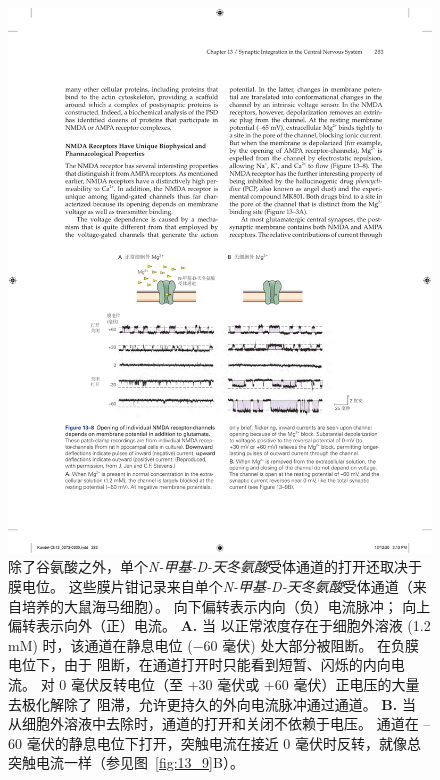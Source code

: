 \begin{figure}[htbp]
	\centering
	\includegraphics[width=0.9\linewidth]{chap13/fig_13_8}
	\caption{除了谷氨酸之外，单个\textit{N-甲基-D-天冬氨酸}受体通道的打开还取决于膜电位。
		这些膜片钳记录来自单个\textit{N-甲基-D-天冬氨酸}受体通道（来自培养的大鼠海马细胞）。
		向下偏转表示内向（负）电流脉冲；
		向上偏转表示向外（正）电流。
		\textbf{A.} 当  以正常浓度存在于细胞外溶液 (1.2 mM) 时，该通道在静息电位 (−60 毫伏) 处大部分被阻断。
		在负膜电位下，由于  阻断，在通道打开时只能看到短暂、闪烁的内向电流。
		对 0 毫伏反转电位（至 +30 毫伏或 +60 毫伏）正电压的大量去极化解除了  阻滞，允许更持久的外向电流脉冲通过通道。
		\textbf{B.} 当  从细胞外溶液中去除时，通道的打开和关闭不依赖于电压。
		通道在 –60 毫伏的静息电位下打开，突触电流在接近 0 毫伏时反转，就像总突触电流一样（参见图~\ref{fig:13_9}B）。}
	\label{fig:13_8}
\end{figure}


